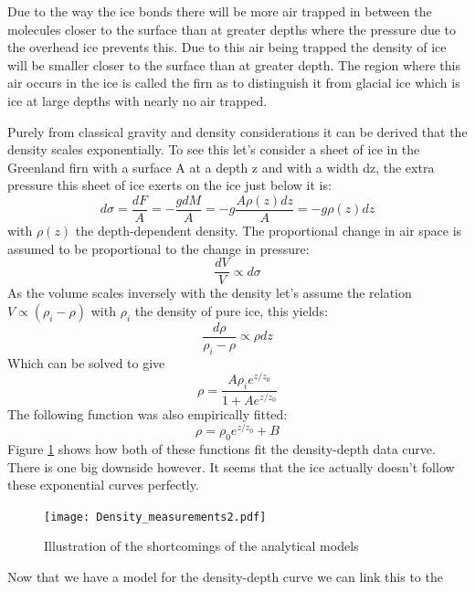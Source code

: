 Due to the way the ice bonds there will be more air trapped in between the
molecules closer to the surface than at greater depths where the pressure due
to the overhead ice prevents this.  Due to this air being trapped the density
of ice will be smaller closer to the surface than at greater depth.  The region
where this air occurs in the ice is called the firn\cite{Firn} as to
distinguish it from glacial ice which is ice at large depths with nearly no air
trapped.

Purely from classical gravity and density considerations it can be derived that
the density scales exponentially. To see this let's consider a sheet of ice in
the Greenland firn with a surface A at a depth z and with a width dz, the extra
pressure this sheet of ice exerts on the ice just below it is:
\begin{equation}
	d\sigma = \frac{dF}{A} = -\frac{gdM}{A} = -g\frac{A\rho(z)dz}{A} = -g\rho(z)dz
\end{equation}
with $\rho(z)$ the depth-dependent density. The proportional change in air
space is assumed to be proportional to the change in
pressure\cite{herron_langway_1980}:
\begin{equation}
	\frac{dV}{V} \propto d\sigma
\end{equation}
As the volume scales inversely with the density let's assume the relation $V \propto (\rho_i - \rho)$ with
$\rho_i$ the density of pure ice, this yields:
\begin{equation}
	\frac{d\rho}{\rho_i - \rho} \propto \rho dz
\end{equation}
Which can be solved to give
\begin{equation}
	\rho = \frac{A\rho_i e^{z/z_0}}{1 + Ae^{z/z_0}}
\end{equation}
The following function was also empirically fitted:
\begin{equation}
	\label{eqn:myderiexp}
	\rho = \rho_0 e^{z/z_0} + B
\end{equation}
Figure \ref{fig:DensityMeasurements} shows how both of these functions fit the
density-depth data\cite{alley_koci_1988}\cite{hawley_morris_mcconnell_2008}
curve.  There is one big downside however.  It seems that the ice actually
doesn't follow these exponential curves perfectly.
\begin{figure}
  \centering
	\texttt{[image: Density\_measurements2.pdf]}
	\caption{Illustration of the shortcomings of the analytical models}
	\label{fig:DensityMeasurements}
\end{figure}
Now that we have a model for the density-depth curve we can link this to the
